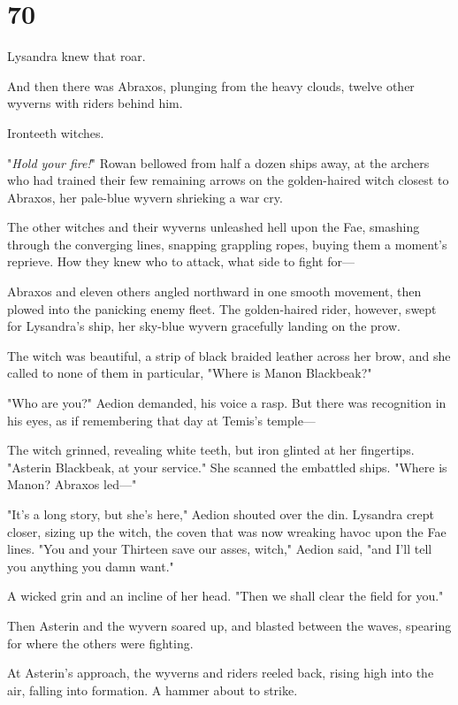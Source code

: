 
\chapter{70}

Lysandra knew that roar.

And then there was Abraxos, plunging from the heavy clouds, twelve other wyverns with riders behind him.

Ironteeth witches.

"\emph{Hold your fire!}" Rowan bellowed from half a dozen ships away, at the archers who had trained their few remaining arrows on the golden-haired witch closest to Abraxos, her pale-blue wyvern shrieking a war cry.

The other witches and their wyverns unleashed hell upon the Fae, smashing through the converging lines, snapping grappling ropes, buying them a moment's reprieve.
How they knew who to attack, what side to fight for---

Abraxos and eleven others angled northward in one smooth movement, then plowed into the panicking enemy fleet.
The golden-haired rider, however, swept for Lysandra's ship, her sky-blue wyvern gracefully landing on the prow.

The witch was beautiful, a strip of black braided leather across her brow, and she called to none of them in particular, "Where is Manon Blackbeak?"

"Who are you?"
Aedion demanded, his voice a rasp.
But there was recognition in his eyes, as if remembering that day at Temis's temple---

The witch grinned, revealing white teeth, but iron glinted at her fingertips.
"Asterin Blackbeak, at your service."
She scanned the embattled ships.
"Where is Manon?
Abraxos led---"

"It's a long story, but she's here," Aedion shouted over the din.
Lysandra crept closer, sizing up the witch, the coven that was now wreaking havoc upon the Fae lines.
"You and your Thirteen save our asses, witch," Aedion said, "and I'll tell you anything you damn want."

A wicked grin and an incline of her head.
"Then we shall clear the field for you."

Then Asterin and the wyvern soared up, and blasted between the waves, spearing for where the others were fighting.

At Asterin's approach, the wyverns and riders reeled back, rising high into the air, falling into formation.
A hammer about to strike.

